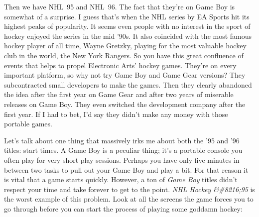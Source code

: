 \documentclass{book}
\let\oldcenter\center
\let\oldendcenter\endcenter
\renewenvironment{center}{\setlength\topsep{0pt}\oldcenter}{\oldendcenter}
\begin{document}
Then we have NHL 95 and NHL 96. The fact that they’re on Game Boy is somewhat of a surprise. I guess that’s when the NHL series by EA Sports hit its highest peaks of popularity. It seems even people with no interest in the sport of hockey enjoyed the series in the mid ’90s. It also coincided with the most famous hockey player of all time, Wayne Gretzky, playing for the most valuable hockey club in the world, the New York Rangers. So you have this great confluence of events that helps to propel Electronic Arts’ hockey games. They’re on every important platform, so why not try Game Boy and Game Gear versions? They subcontracted small developers to make the games. Then they clearly abandoned the idea after the first year on Game Gear and after two years of miserable releases on Game Boy. They even switched the development company after the first year. If I had to bet, I’d say they didn’t make any money with those portable games.

Let’s talk about one thing that massively irks me about both the ’95 and ’96 titles: start times. A Game Boy is a peculiar thing; it’s a portable console you often play for very short play sessions. Perhaps you have only five minutes in between two tasks to pull out your Game Boy and play a bit. For that reason it is vital that a game starts quickly. However, a ton of \emph{Game Boy} titles didn’t respect your time and take forever to get to the point. \emph{NHL Hockey &\#8216;95} is the worst example of this problem. Look at all the screens the game forces you to go through before you can start the process of playing some goddamn hockey:

\begin{center}
\vspace{8pt}
\quad\vspace{4pt}
\quad\vspace{4pt}
\quad\vspace{4pt}
\quad\vspace{4pt}
\quad\vspace{4pt}
\quad\vspace{4pt}
\quad\vspace{4pt}
\quad\vspace{4pt}
\quad\vspace{4pt}
\end{center}
\end{document}
